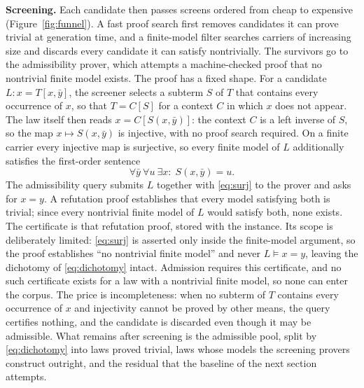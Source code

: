 
\textbf{Screening.} Each candidate then passes screens ordered from cheap to
expensive (Figure~\ref{fig:funnel}). A fast proof search first removes
candidates it can prove trivial at generation time, and a finite-model filter
searches carriers of increasing size and discards every candidate it can
satisfy nontrivially. The survivors go to the admissibility prover, which
attempts a machine-checked proof that no nontrivial finite model exists. The
proof has a fixed shape. For a candidate $L\colon x = T[x,\bar y]$, the
screener selects a subterm $S$ of $T$ that contains every occurrence of $x$,
so that $T = C[S]$ for a context $C$ in which $x$ does not appear. The law
itself then reads $x = C[S(x,\bar y)]$: the context $C$ is a left inverse of
$S$, so the map $x \mapsto S(x,\bar y)$ is injective, with no proof search
required. On a finite carrier every injective map is surjective, so every
finite model of $L$ additionally satisfies the first-order sentence
\begin{equation}
\label{eq:surj}
\forall \bar y\ \forall u\ \exists x\colon\; S(x,\bar y) = u.
\end{equation}
The admissibility query submits $L$ together with \eqref{eq:surj} to the
prover and asks for $x = y$. A refutation proof establishes that every model
satisfying both is trivial; since every nontrivial finite model of $L$ would
satisfy both, none exists. The certificate is that refutation proof, stored
with the instance. Its scope is deliberately limited: \eqref{eq:surj} is
asserted only inside the finite-model argument, so the proof establishes
``no nontrivial finite model'' and never $L \models x = y$, leaving the
dichotomy of \eqref{eq:dichotomy} intact. Admission requires this
certificate, and no such certificate exists for a law with a nontrivial
finite model, so none can enter the corpus. The price is incompleteness:
when no subterm of $T$ contains every occurrence of $x$ and injectivity
cannot be proved by other means, the query certifies nothing, and the
candidate is discarded even though it may be admissible. What remains after
screening is the admissible pool, split by \eqref{eq:dichotomy} into laws
proved trivial, laws whose models the screening provers construct outright,
and the residual that the baseline of the next section attempts.

